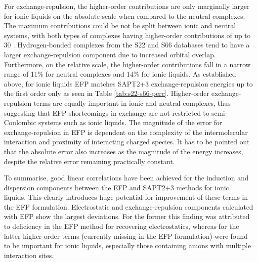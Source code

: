 For exchange-repulsion, the higher-order contributions are only marginally larger for ionic liquids on the absolute scale when compared to the neutral complexes.
The maximum contributions could be not be split between ionic and neutral systems, with both types of complexes having higher-order contributions of up to 30 \enUnit.
Hydrogen-bonded complexes from the S22 and S66 databases tend to have a larger exchange-repulsion component due to increased orbital overlap.
Furthermore, on the relative scale, the higher-order contributions fall in a narrow range of 11\% for neutral complexes and 14\% for ionic liquids.
As established above, for ionic liquids EFP matches SAPT2+3 exchange-repulsion energies up to the first order only as seen in Table \ref{tab:s22-s66-perc}.
Higher-order exchange-repulsion terms are equally important in ionic and neutral complexes, thus suggesting that EFP shortcomings in exchange are not restricted to semi-Coulombic systems such as ionic liquids.
The magnitude of the error for exchange-repulsion in EFP is dependent on the complexity of the intermolecular interaction and proximity of interacting charged species. 
It has to be pointed out that the absolute error also increases as the magnitude of the energy increases, despite the relative error remaining practically constant.

To summarise, good linear correlations have been achieved for the induction and dispersion components between the EFP and SAPT2+3 methods for ionic liquids. This clearly introduces huge potential for improvement of these terms in the EFP formulation. Electrostatic and exchange-repulsion components calculated with EFP show the largest deviations. For the former this finding was attributed to deficiency in the EFP method for recovering electrostatics, whereas for the latter higher-order terms (currently missing in the EFP formulation) were found to be important for ionic liquids, especially those containing anions with multiple interaction sites.   

